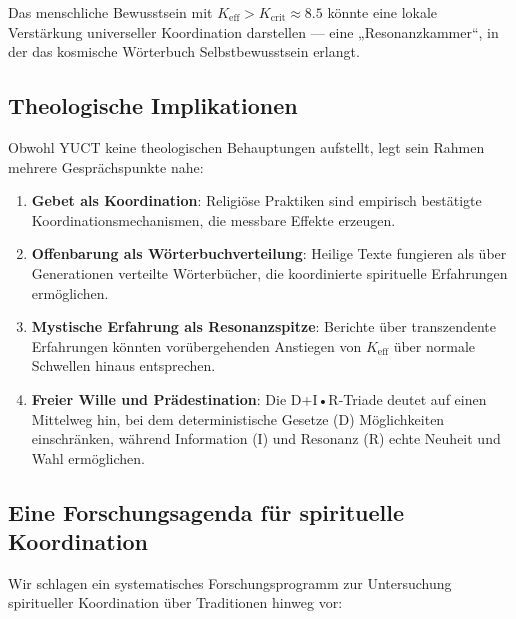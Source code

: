 \documentclass[12pt,a4paper]{article}
\newcommand{\Kcrit}{K_{\mathrm{crit}}}
\begin{document}
	Das menschliche Bewusstsein mit $K_{\mathrm{eff}} > \Kcrit \approx 8.5$ könnte eine lokale Verstärkung universeller Koordination darstellen — eine „Resonanzkammer“, in der das kosmische Wörterbuch Selbstbewusstsein erlangt.
	
	\subsection{Theologische Implikationen}
	
	Obwohl YUCT keine theologischen Behauptungen aufstellt, legt sein Rahmen mehrere Gesprächspunkte nahe:
	
	\begin{enumerate}
		\item \textbf{Gebet als Koordination}: Religiöse Praktiken sind empirisch bestätigte Koordinationsmechanismen, die messbare Effekte erzeugen.
		
		\item \textbf{Offenbarung als Wörterbuchverteilung}: Heilige Texte fungieren als über Generationen verteilte Wörterbücher, die koordinierte spirituelle Erfahrungen ermöglichen.
		
		\item \textbf{Mystische Erfahrung als Resonanzspitze}: Berichte über transzendente Erfahrungen könnten vorübergehenden Anstiegen von $K_{\mathrm{eff}}$ über normale Schwellen hinaus entsprechen.
		
		\item \textbf{Freier Wille und Prädestination}: Die D+I•R-Triade deutet auf einen Mittelweg hin, bei dem deterministische Gesetze (D) Möglichkeiten einschränken, während Information (I) und Resonanz (R) echte Neuheit und Wahl ermöglichen.
	\end{enumerate}
	
	\subsection{Eine Forschungsagenda für spirituelle Koordination}
	
	Wir schlagen ein systematisches Forschungsprogramm zur Untersuchung spiritueller Koordination über Traditionen hinweg vor:
	
\end{document}
